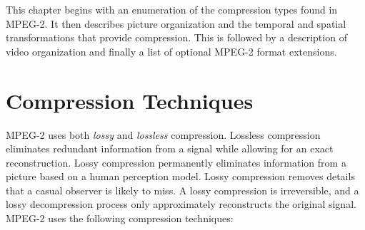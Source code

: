 This chapter begins with an enumeration 
of the compression types found in MPEG-2.
It then describes picture organization and the temporal and spatial
transformations that provide compression. 
This is followed by a description of video
organization and finally a list of optional MPEG-2 format extensions.

\section{Compression Techniques}
MPEG-2 uses both {\it lossy} and {\it lossless} compression. 
Lossless compression eliminates redundant information from a signal while allowing
for an exact reconstruction. 
Lossy compression permanently eliminates information from a picture based on
a human perception model. Lossy compression removes details that a casual
observer is likely to miss. A lossy compression is irreversible,
and a lossy decompression process only approximately reconstructs the original
signal. MPEG-2 uses the following compression techniques:

